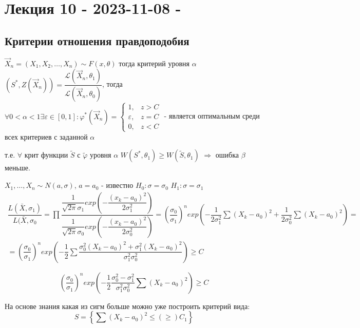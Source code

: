 \section{Лекция 10 - 2023-11-08 - }



\subsection{Критерии отношения правдоподобия}

\begin{theorem}
  $\vec{X}_n = (X_1, X_2,\dots, X_n) \sim F(x, \theta)$ тогда критерий уровня $\alpha$ $(S^*, Z(\vec{X}_n)) = \dfrac{\mathcal{L} (\vec{X}_n, \theta_1)}{\mathcal{L}(\vec{X}_n, \theta_0)}$, тогда $\forall 0 < \alpha < 1 \exists \varepsilon \in [0, 1] : \varphi^*(\vec{X}_n) = \begin{cases}
    1, &z > C \\
    \varepsilon, &z=C \\
    0, &z<C
  \end{cases}
  $ - является оптимальным среди всех критериев с заданной $\alpha$
  
  т.е. $\forall$ крит функции $\tilde S$ с $\tilde \varphi$ уровня $\alpha$ $W(S^*, \theta_1) \geqslant W(\tilde S, \theta_1)$ $\Rightarrow$ ошибка $\beta$ меньше.
\end{theorem}



\begin{ex}
  $X_1,\dots,X_n \sim N(a, \sigma)$, $a = a_0$ - известно
  $H_0 : \sigma = \sigma_0$
  $H_1 : \sigma = \sigma_1$
  \begin{multline*}
    \dfrac{L(\bar X, \sigma_1)}{L(\bar X, \sigma_0}
    = \prod \dfrac{\dfrac{1}{\sqrt{2\pi} \sigma_1} exp\left(- \dfrac{(x_k - a_0)^2}{2\sigma_1^2}\right)}{\dfrac{1}{\sqrt{2\pi} \sigma_0} exp\left(- \dfrac{(x_k - a_0)^2}{2\sigma_0^2}\right)}
    = \left(\dfrac{\sigma_0}{\sigma_1}\right)^n exp\left(-\dfrac{1}{2\sigma_1^2} \sum (X_k-a_0)^2 + \dfrac{1}{2\sigma_0^2} \sum (X_k-a_0)^2 \right) = \\
    = \left(\dfrac{\sigma_0}{\sigma_1}\right)^n exp\left( -\dfrac{1}{2} \sum \dfrac{\sigma_0^2 (X_k-a_0)^2 + \sigma_1^2 (X_k - a_0)^2}{\sigma_1^2 \sigma_0^2} \right) \geqslant C
  \end{multline*}

  \begin{equation*}
    \left(\dfrac{\sigma_0}{\sigma_1}\right)^n exp\left(-\dfrac{1}{2} \dfrac{\sigma_0^2 - \sigma_1^2}{\sigma_1^2 \sigma_0^2} \sum (X_k-a_0)^2\right) \geqslant C
  \end{equation*}

  На основе знания какая из сигм больше можно уже построить критерий вида:
  $$ S = \left\{ \sum(X_k-a_0)^2 \leqslant (\geqslant) C_1 \right\} $$
\end{ex}

